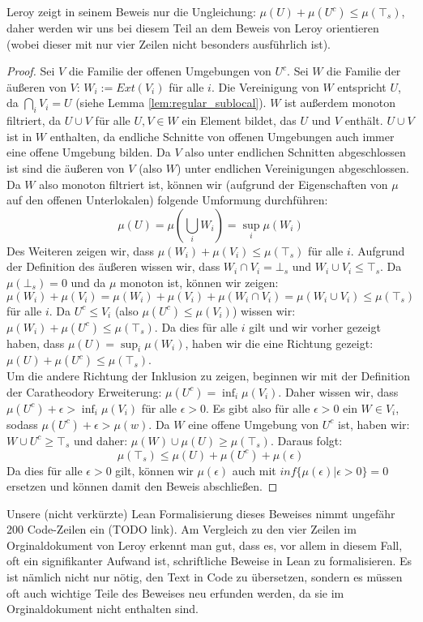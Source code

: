 \documentclass{article}
\begin{document}
Leroy zeigt in seinem Beweis nur die Ungleichung: $\mu(U) + \mu(U^c) \le \mu(\top_s)$, daher werden wir uns bei diesem Teil an dem Beweis von Leroy orientieren (wobei dieser mit nur vier Zeilen nicht besonders ausführlich ist).\\
\begin{proof}
    Sei $V$ die Familie der offenen Umgebungen von $U^c$. Sei $W$ die Familie der äußeren von $V$: $W_i := Ext(V_i)$ für alle $i$. Die Vereinigung von $W$ entspricht $U$, da $\bigcap_i V_i = U$ (siehe Lemma \ref{lem:regular_sublocal}). $W$ ist außerdem monoton filtriert, da $U \cup V$ für alle $U, V \in W$ ein Element bildet, das $U$ und $V$ enthält. $U \cup V$ ist in $W$ enthalten, da endliche Schnitte von offenen Umgebungen auch immer eine offene Umgebung bilden. Da $V$ also unter endlichen Schnitten abgeschlossen ist sind die äußeren von $V$ (also $W$) unter endlichen Vereinigungen abgeschlossen. Da $W$ also monoton filtriert ist, können wir (aufgrund der Eigenschaften von $\mu$ auf den offenen Unterlokalen) folgende Umformung durchführen: $$\mu(U) = \mu(\bigcup_i W_i) = \sup_i \mu (W_i)$$
    Des Weiteren zeigen wir, dass $\mu(W_i) + \mu(V_i) \le \mu(\top_s)$ für alle $i$. Aufgrund der Definition des äußeren wissen wir, dass $W_i \cap V_i = \bot_s$ und $W_i \cup V_i \le \top_s$. Da $\mu(\bot_s) = 0$ und da $\mu$ monoton ist, können wir zeigen: 
    $$\mu(W_i) + \mu(V_i) = \mu(W_i) + \mu(V_i) + \mu(W_i \cap V_i) = \mu(W_i \cup V_i) \le \mu(\top_s)$$ für alle $i$. 
    Da $U^c \le V_i$ (also $\mu(U^c) \le \mu (V_i)$) wissen wir: $\mu(W_i) + \mu(U^c) \le \mu(\top_s)$. Da dies für alle $i$ gilt und wir vorher gezeigt haben, dass $\mu(U) = \sup_i \mu (W_i)$, haben wir die eine Richtung gezeigt: $\mu(U) + \mu(U^c) \le \mu(\top_s)$. \\
    Um die andere Richtung der Inklusion zu zeigen, beginnen wir mit der Definition der Caratheodory Erweiterung: $\mu(U^c) = \inf_i \mu(V_i)$. Daher wissen wir, dass $\mu(U^c) + \epsilon > \inf_i \mu(V_i)$ für alle $\epsilon > 0$. Es gibt also für alle $\epsilon > 0$ ein $W \in V_i$, sodass $\mu(U^c) + \epsilon > \mu(w)$. Da $W$ eine offene Umgebung von $U^c$ ist, haben wir: $W \cup U^c \ge \top_s$ und daher: $\mu(W) \cup \mu(U) \ge \mu(\top_s)$. Daraus folgt: $$\mu(\top_s) \le \mu(U) + \mu(U^c) + \mu(\epsilon)$$ Da dies für alle $\epsilon > 0$ gilt, können wir $\mu(\epsilon)$ auch mit $inf \{ \mu(\epsilon) | \epsilon > 0\} = 0$ ersetzen und können damit den Beweis abschließen.
\end{proof}
Unsere (nicht verkürzte) Lean Formalisierung dieses Beweises nimmt ungefähr 200 Code-Zeilen ein (TODO link). Am Vergleich zu den vier Zeilen im Orginaldokument von Leroy erkennt man gut, dass es, vor allem in diesem Fall, oft ein signifikanter Aufwand ist, schriftliche Beweise in Lean zu formalisieren. Es ist nämlich nicht nur nötig, den Text in Code zu übersetzen, sondern es müssen oft auch wichtige Teile des Beweises \glqq neu erfunden \grqq{} werden, da sie im Orginaldokument nicht enthalten sind.
\end{document}
